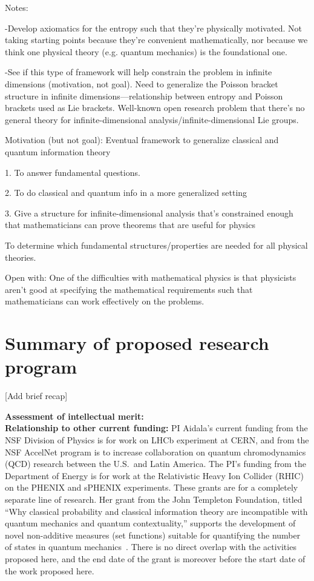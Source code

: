 Notes:

-Develop axiomatics for the entropy such that they’re physically motivated.  Not taking starting points because they’re convenient mathematically, nor because we think one physical theory (e.g. quantum mechanics) is the foundational one.

-See if this type of framework will help constrain the problem in infinite dimensions (motivation, not goal).  Need to generalize the Poisson bracket structure in infinite dimensions—relationship between entropy and Poisson brackets used as Lie brackets.  Well-known open research problem that there’s no general theory for infinite-dimensional analysis/infinite-dimensional Lie groups.

Motivation (but not goal): Eventual framework to generalize classical and quantum information theory

1. To answer fundamental questions.

2. To do classical and quantum info in a more generalized setting

3. Give a structure for infinite-dimensional analysis that’s constrained enough that mathematicians can prove theorems that are useful for physics

To determine which fundamental structures/properties are needed for all physical theories.

Open with: One of the difficulties with mathematical physics is that physicists aren’t good at specifying the mathematical requirements such that mathematicians can work effectively on the problems.



\section{Summary of proposed research program}
[Add brief recap]

\noindent
\textbf{Assessment of intellectual merit:} \\

\noindent
\textbf{Relationship to other current funding:} PI Aidala's current funding from the NSF Division of Physics is for work on LHCb experiment at CERN, and from the NSF AccelNet program is to increase collaboration on quantum chromodynamics (QCD) research between the U.S.~and Latin America.  The PI's funding from the Department of Energy is for work at the Relativistic Heavy Ion Collider (RHIC) on the PHENIX and sPHENIX experiments.  These grants are for a completely separate line of research. Her grant from the John Templeton Foundation, titled ``Why classical probability and classical information theory are incompatible with quantum mechanics and quantum contextuality,'' supports the development of novel non-additive measures (set functions) suitable for quantifying the number of states in quantum mechanics~\cite{aop-nonaddmeas}.  There is no direct overlap with the activities proposed here, and the end date of the grant is moreover before the start date of the work proposed here.  \\

